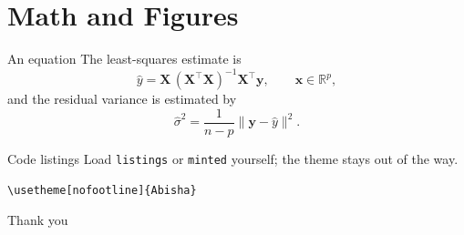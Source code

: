 \documentclass{beamer}
\newcommand{\real}{\mathbb{R}}
\newcommand{\x}{\mathbf{x}}
\newcommand{\y}{\mathbf{y}}
\newcommand{\X}{\mathbf{X}}
\newcommand{\yhat}{\widehat{y}}
\begin{document}
\section{Math and Figures}

\begin{frame}{An equation}
  The least-squares estimate is
  \begin{equation*}
    \yhat = \X\,(\X^\top\X)^{-1}\X^\top\y,
    \qquad \x \in \real^{p},
  \end{equation*}
  and the residual variance is estimated by
  \begin{equation*}
    \hat\sigma^{2} = \frac{1}{n-p}\lVert \y - \yhat \rVert^{2}.
  \end{equation*}
\end{frame}

\begin{frame}[fragile]{Code listings}
  Load \texttt{listings} or \texttt{minted} yourself; the theme stays out of
  the way.
  \begin{verbatim}
\usetheme[nofootline]{Abisha}
  \end{verbatim}
\end{frame}

\begin{frame}[plain,s]
  \centering
  \Huge Thank you\par
\end{frame}
\end{document}
